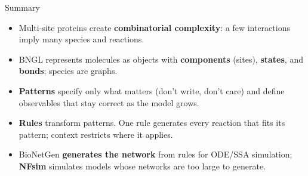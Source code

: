 \documentclass[aspectratio=169,10pt,t]{beamer}
\begin{document}
\begin{frame}{Summary}
  \begin{itemize}[<+->]
    \setlength\itemsep{2mm}
    \item Multi-site proteins create \textbf{combinatorial complexity}: a few
          interactions imply many species and reactions.
    \item BNGL represents molecules as objects with \textbf{components} (sites),
          \textbf{states}, and \textbf{bonds}; species are graphs.
    \item \textbf{Patterns} specify only what matters (don't write, don't care) and
          define observables that stay correct as the model grows.
    \item \textbf{Rules} transform patterns. One rule generates every reaction that
          fits its pattern; context restricts where it applies.
    \item BioNetGen \textbf{generates the network} from rules for ODE/SSA simulation;
          \textbf{NFsim} simulates models whose networks are too large to generate.
  \end{itemize}
\end{frame}
\end{document}
